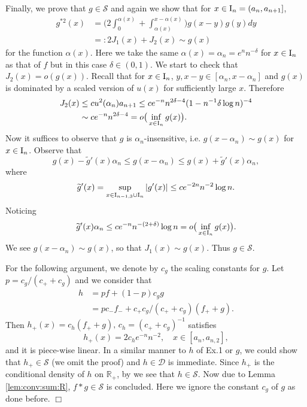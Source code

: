 \documentclass[12pt,leqno]{amsart}
\newcommand{\rI}{{\rm I}}
\newcommand{\R}{\mathbb{R}}
\newcommand{\wt}{\widetilde}
\newcommand{\cals}{{\mathcal S}}
\newcommand{\cald}{{\mathcal D}}
\newcommand{\1}{{\mathbf 1}}
\begin{document}
Finally, we prove that $g\in \cals$ and again we show that for $x\in \rI_n=(a_n,a_{n+1}]$,  
\begin{align*}
 g^{\ast 2}(x) &= \Big(
2 \int_{0}^{\alpha(x)} + \int_{\alpha(x)}^{x-\alpha(x)}
\Big) g(x-y)g(y)dy \\
& =: 2J_1(x) +J_2(x) \sim g(x) 
\end{align*}
for the function $\alpha(x)$. Here we take the same $\alpha(x)=\alpha_n=e^n n^{-\delta}$ for $x\in \rI_n$ as that of $f$ but in this 
case $\delta\in (0,1)$. 
We start to check that $J_2(x)=o(g(x))$. Recall that for $x\in \rI_n$, $y,x-y \in [\alpha_n,x-\alpha_n]$ and $g(x)$ 
is dominated by a scaled version of $u(x)$ for sufficiently large $x$. Therefore 
\begin{align*}
 J_2 (x) &\le cu^2(\alpha_n) a_{n+1} \le c e^{-n}n^{2\delta-4}(1-n^{-1} \delta \log n)^{-4} \\
& \sim c e^{-n}n^{2\delta -4} =o\big(
\inf_{x\in \rI_n} g(x)
\big).
\end{align*}
Now it suffices to observe that $g$ is $\alpha_n$-insensitive, i.e. 
$g(x-\alpha_n)\sim g(x)$ for $x\in \rI_n$. Observe that 
\[
 g(x)-\wt g'(x) \alpha_n\le g(x-\alpha_n) \le g(x) +\wt g'(x) \alpha_n,
\]
where 
\[
 \wt g'(x) = \sup_{x\in \rI_{n-1,3}\cup \rI_n}|g'(x)| \le c e^{-2n} n^{-2}\log n.
\]
Noticing 
\[
 \wt g'(x)\alpha_n \le c e^{-n} n^{-(2+\delta)} \log n =o\big(
\inf_{x\in \rI_n} g(x)
\big).
\]
We see $g(x-\alpha_n)\sim g(x)$, so that $J_1(x)\sim g(x)$. Thus $g\in \cals$.


For the following argument, we denote by $c_g$ the scaling constants for $g$. 
Let $p=c_g/(c_++c_g)$ and we consider that 
\begin{align*}
 h &= p f+(1-p)c_g g \\
   &= p c_- f_- + c_+c_g/(c_++ c_g)(f_++g). 
\end{align*}
Then $h_+(x)=c_h(f_++g),\,c_h=(c_+ + c_g)^{-1}$ satisfies
\[
 h_+(x)= 2 c_h e^{-n}n^{-2},\quad x \in [a_n,a_{n,2}],   
\]
and it is piece-wise linear. In a similar manner to $h$ of Ex.1 or $g$, we could show that 
$h_+\in \cals$ (we omit the proof) and $h\in \cald$ is immediate. 
Since $h_+$ is the conditional density of $h$ on $\R_+$, by \cite[Lemma 4.13]{Foss:Korshunov:Zachary:2013} we see that $h \in \cals$. 
Now due to Lemma \ref{lem:conv:sum:R}, $f\ast g\in \cals$ is concluded. Here we ignore the constant $c_g$ of $g$ as done before. \hfill $\Box$\\ 
\end{document}
